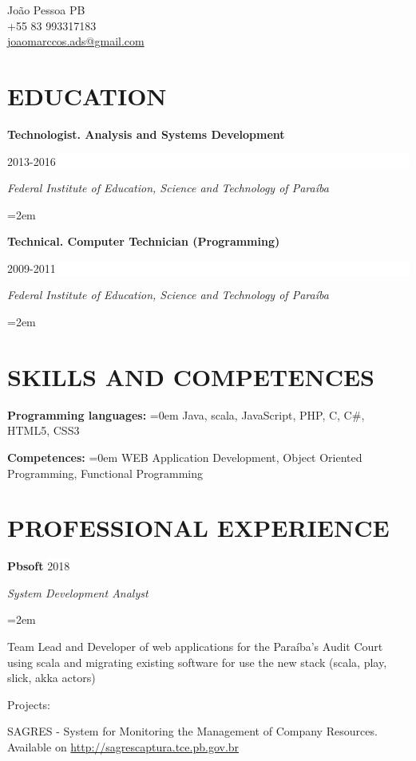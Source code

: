 \documentclass[paper=a4,fontsize=14pt]{article}
\let\olditemize\itemize
\let\endolditemize\enditemize
\renewenvironment{itemize}{%
    \small
    \olditemize
}{%
    \endolditemize
}
\newcommand{\NewPart}[1]{ \section*{\large \uppercase{#1}}}
\newcommand{\EducationEntry}[4]{
		\noindent \textbf{#1} \hfill 			%
		\colorbox{White}{%
			\parbox{6em}{%
			\hfill\color{Black}#2}} \par		%
		\noindent \textit{#3} \par			%
		\noindent\hangindent=2em\hangafter=0 \small #4 	%
		\normalsize \par}
\newcommand{\WorkEntry}[4]{						%
		\noindent \textbf{#1} \hfill 				%
		\colorbox{White}{\color{Black}#2} \par			%
		\noindent \textit{#3} \par				%
		\noindent\hangindent=2em\hangafter=0 \small #4 		%
		\normalsize \par \vspace*{.5em}}
\newcommand{\Resume}[2]{						%
		\noindent \textbf{#1: } 				%
		\noindent\hangindent=0em\hangafter=0 \small #2   	%
		\normalsize \par \vspace*{.5em}}
\begin{document}
\begin{center}
João Pessoa PB\\
+55 83 993317183\\
\url{joaomarccos.ads@gmail.com}
\end{center}

\NewPart{Education}{} 

\EducationEntry{Technologist. Analysis and Systems Development}{2013-2016}{Federal Institute of Education, Science and Technology of Paraíba}{}
\EducationEntry{Technical. Computer Technician (Programming)}{2009-2011}{Federal Institute of Education, Science and Technology of Paraíba}{}

\NewPart{Skills and competences}{}
\Resume{\textbf{Programming languages}}{Java, scala,  JavaScript, PHP, C, C\#, HTML5, CSS3}
\Resume{\textbf{Competences}}{WEB Application Development, Object Oriented Programming, Functional Programming}  

\NewPart{Professional experience}{}

\WorkEntry{Pbsoft}{2018}{System Development Analyst}{
\begin{itemize}
    \item Team Lead and Developer of web applications for the Paraíba's Audit Court using scala and migrating existing software for use the new stack (scala, play, slick, akka actors)
    \item Projects:
    \begin{itemize}
        \item SAGRES - System for Monitoring the Management of Company Resources. \\Available on \url{http://sagrescaptura.tce.pb.gov.br}
    \end{itemize}
\end{itemize}
}
\end{document}
